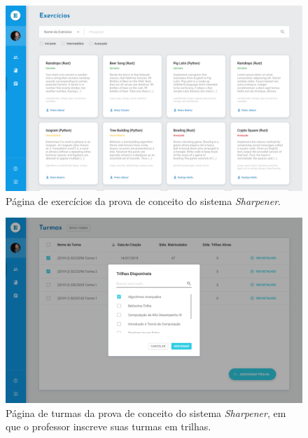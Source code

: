   \begin{figure}[htpb]
  \centering
  \includegraphics[width=\linewidth]{images/mocks/exercicios.png}
  \caption{Página de exercícios da prova de conceito do sistema \emph{Sharpener}.}%
  \label{fig:exercicios}
  \end{figure}
  
  \begin{figure}[htpb]
    \centering
    \includegraphics[width=\linewidth]{images/mocks/turmaAddTrack.png}
    \caption{Página de turmas da prova de conceito do sistema \emph{Sharpener}, em 
	    que o professor inscreve suas turmas em trilhas.}%
    \label{fig:enroll_track1}
  \end{figure}
  
